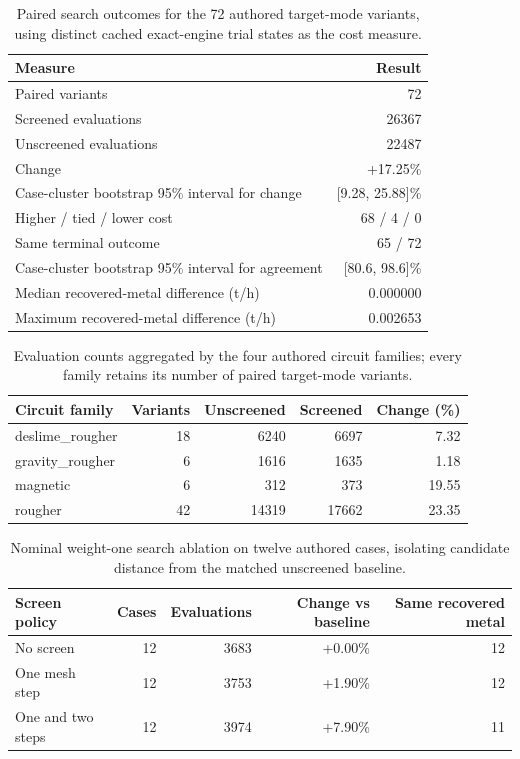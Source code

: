 \begin{table}[htbp]
\centering
\small
\caption{Paired search outcomes for the 72 authored target-mode variants, using distinct cached exact-engine trial states as the cost measure.}
\label{tab:paired}
\begin{tabular}{lr}
\toprule
Measure & Result \\
\midrule
Paired variants & 72 \\
Screened evaluations & 26367 \\
Unscreened evaluations & 22487 \\
Change & +17.25\% \\
Case-cluster bootstrap 95\% interval for change & [9.28, 25.88]\% \\
Higher / tied / lower cost & 68 / 4 / 0 \\
Same terminal outcome & 65 / 72 \\
Case-cluster bootstrap 95\% interval for agreement & [80.6, 98.6]\% \\
Median recovered-metal difference (t/h) & 0.000000 \\
Maximum recovered-metal difference (t/h) & 0.002653 \\
\bottomrule
\end{tabular}
\end{table}

\begin{table}[htbp]
\centering
\small
\caption{Evaluation counts aggregated by the four authored circuit families; every family retains its number of paired target-mode variants.}
\label{tab:families}
\begin{tabular}{lrrrr}
\toprule
Circuit family & Variants & Unscreened & Screened & Change (\%) \\
\midrule
deslime\_rougher & 18 & 6240 & 6697 & 7.32 \\
gravity\_rougher & 6 & 1616 & 1635 & 1.18 \\
magnetic & 6 & 312 & 373 & 19.55 \\
rougher & 42 & 14319 & 17662 & 23.35 \\
\bottomrule
\end{tabular}
\end{table}

\begin{table}[htbp]
\centering
\small
\caption{Nominal weight-one search ablation on twelve authored cases, isolating candidate distance from the matched unscreened baseline.}
\label{tab:ablation}
\begin{tabular}{lrrrr}
\toprule
Screen policy & Cases & Evaluations & Change vs baseline & Same recovered metal \\
\midrule
No screen & 12 & 3683 & +0.00\% & 12 \\
One mesh step & 12 & 3753 & +1.90\% & 12 \\
One and two steps & 12 & 3974 & +7.90\% & 11 \\
\bottomrule
\end{tabular}
\end{table}

